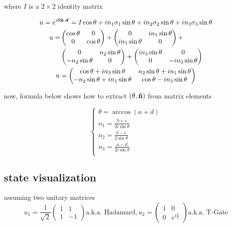 \documentclass[11pt]{article}
\begin{document}
where $I$ is a $2\times 2$ identity matrix

\begin{gather*}
u = e^{i\theta \vu{n} \cdot \va*{\sigma}} = I \cos\theta + i n_1 \sigma_1 \sin\theta + i n_2 \sigma_2 \sin\theta  + i n_3 \sigma_3 \sin\theta \\
\begin{align*} u =& \begin{pmatrix}
\cos\theta & 0 \\ 
0 & \cos\theta 
\end{pmatrix} + 
\begin{pmatrix} 
0 & in_1\sin\theta \\
in_1\sin\theta & 0 
\end{pmatrix} + \\ &
\begin{pmatrix} 
0 & n_2\sin\theta \\
-n_2\sin\theta & 0 
\end{pmatrix} +
\begin{pmatrix} 
in_3\sin\theta & 0\\
0 & -in_3\sin\theta 
\end{pmatrix}
\end{align*} \\
u = \begin{pmatrix}
\cos\theta + in_3\sin\theta & n_2\sin\theta + i n_1\sin\theta \\ 
- n_2\sin\theta + i n_1\sin\theta & \cos\theta - in_3\sin\theta
\end{pmatrix}
\end{gather*}

now, formula below shows how to extract $(\theta, \vu{n})$ from matrix elements

\begin{equation}
\begin{cases}
  \theta = \arccos (a + d) \\
  n_1 = \frac{b + c}{2i\sin\theta} \\
  n_2 = \frac{b - c}{2\sin\theta} \\
  n_3 = \frac{a - d}{2i\sin\theta} \\
\end{cases}
\end{equation}

\subsection{state visualization}

assuming two unitary matrices
\[ u_1 = \frac{1}{\sqrt{2}} \begin{pmatrix} 1 & 1 \\ 1 & -1 \end{pmatrix} \text{a.k.a. Hadamard}, u_2 = \begin{pmatrix} 1 & 0 \\ 0 & e^{i\frac{\pi}{4}} \end{pmatrix} \text{a.k.a. T-Gate}  \]
\end{document}
